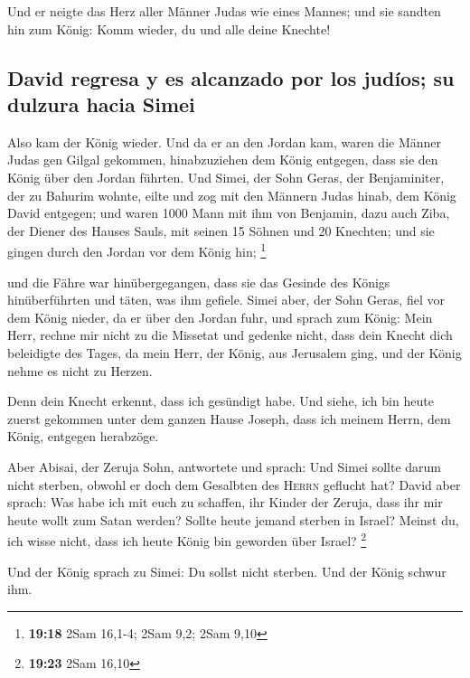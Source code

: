  Und er neigte das Herz aller Männer Judas wie eines
Mannes; und sie sandten hin zum König: Komm wieder, du und alle deine
Knechte!

\hypertarget{david-regresa-y-es-alcanzado-por-los-juduxedos-su-dulzura-hacia-simei}{%
\subsection{David regresa y es alcanzado por los judíos; su dulzura
hacia
Simei}\label{david-regresa-y-es-alcanzado-por-los-juduxedos-su-dulzura-hacia-simei}}

 Also kam der König wieder. Und da er an den Jordan kam,
waren die Männer Judas gen Gilgal gekommen, hinabzuziehen dem König
entgegen, dass sie den König über den Jordan führten. 
Und Simei, der Sohn Geras, der Benjaminiter, der zu Bahurim wohnte,
eilte und zog mit den Männern Judas hinab, dem König David entgegen;
 und waren 1000 Mann mit ihm von Benjamin, dazu auch
Ziba, der Diener des Hauses Sauls, mit seinen 15 Söhnen und 20 Knechten;
und sie gingen durch den Jordan vor dem König hin; \footnote{\textbf{19:18}
  2Sam 16,1-4; 2Sam 9,2; 2Sam 9,10}

 und die Fähre war hinübergegangen, dass sie das Gesinde
des Königs hinüberführten und täten, was ihm gefiele. Simei aber, der
Sohn Geras, fiel vor dem König nieder, da er über den Jordan fuhr,
 und sprach zum König: Mein Herr, rechne mir nicht zu die
Missetat und gedenke nicht, dass dein Knecht dich beleidigte des Tages,
da mein Herr, der König, aus Jerusalem ging, und der König nehme es
nicht zu Herzen.

 Denn dein Knecht erkennt, dass ich gesündigt habe. Und
siehe, ich bin heute zuerst gekommen unter dem ganzen Hause Joseph, dass
ich meinem Herrn, dem König, entgegen herabzöge.

 Aber Abisai, der Zeruja Sohn, antwortete und sprach: Und
Simei sollte darum nicht sterben, obwohl er doch dem Gesalbten des
\textsc{Herrn} geflucht hat?  David aber sprach: Was habe
ich mit euch zu schaffen, ihr Kinder der Zeruja, dass ihr mir heute
wollt zum Satan werden? Sollte heute jemand sterben in Israel? Meinst
du, ich wisse nicht, dass ich heute König bin geworden über Israel?
\footnote{\textbf{19:23} 2Sam 16,10}

 Und der König sprach zu Simei: Du sollst nicht sterben.
Und der König schwur ihm.

